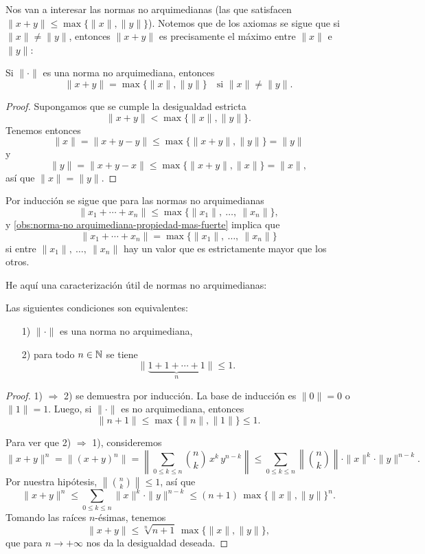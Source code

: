 \documentclass{article}
\numberwithin{equation}{section}
\theoremstyle{definition}
\begin{document}
Nos van a interesar las normas no arquimedianas (las que satisfacen
$\|x + y\| \le \max \{ \|x\|, \|y\| \}$). Notemos que de los axiomas se sigue
que si $\|x\| \ne \|y\|$, entonces $\|x+y\|$ es precisamente el máximo entre
$\|x\|$ e $\|y\|$:

\begin{observacion}
  \label{obs:norma-no arquimediana-propiedad-mas-fuerte}
  Si $\|\cdot\|$ es una norma no arquimediana, entonces
  $$\|x + y\| = \max \{ \|x\|, \|y\| \} \quad\text{si }\|x\| \ne \|y\|.$$

  \begin{proof}
    Supongamos que se cumple la desigualdad estricta
    $$\|x+y\| < \max \{ \|x\|, \|y\| \}.$$
    Tenemos entonces
    $$\|x\| = \|x+y-y\| \le \max \{ \|x+y\|, \|y\| \} = \|y\|$$
    y
    $$\|y\| = \|x+y-x\| \le \max \{ \|x+y\|, \|x\| \} = \|x\|,$$
    así que $\|x\| = \|y\|$.
  \end{proof}
\end{observacion}

Por inducción se sigue que para las normas no arquimedianas
$$\|x_1 + \cdots + x_n\| \le \max \{ \|x_1\|, ~ \ldots, ~ \|x_n\| \},$$
y \ref{obs:norma-no arquimediana-propiedad-mas-fuerte} implica que
$$\|x_1 + \cdots + x_n\| = \max \{ \|x_1\|, ~ \ldots, ~ \|x_n\| \}$$
si entre $\|x_1\|, ~ \ldots, ~ \|x_n\|$ hay un valor que es estrictamente mayor
que los otros.

\vspace{1em}

He aquí una caracterización útil de normas no arquimedianas:

\begin{observacion}
  \label{obs:caracterizacion-de-normas-no-arquimedianas-valor-en-Z}
  Las siguientes condiciones son equivalentes:

  \begin{enumerate}
  \item[1)] $\|\cdot\|$ es una norma no arquimediana,

  \item[2)] para todo $n\in \mathbb{N}$ se tiene
    $$\|\underbrace{1+1+\cdots+1}_n\| \le 1.$$
  \end{enumerate}

  \begin{proof}
    1) $\Rightarrow$ 2) se demuestra por inducción. La base de inducción
    es $\|0\| = 0$ o $\|1\| = 1$. Luego, si $\|\cdot\|$ es no arquimediana,
    entonces
    $$\|n+1\| \le \max \{ \|n\|, \|1\| \} \le 1.$$

    Para ver que 2) $\Rightarrow$ 1), consideremos
    \[ \|x+y\|^n =
       \|(x+y)^n\| =
       \left\|\sum_{0 \le k \le n} {n\choose k}\,x^k\,y^{n-k}\right\| \le
       \sum_{0\le k \le n} \left\|{n\choose k}\right\|\cdot\|x\|^k\cdot\|y\|^{n-k}. \]
    Por nuestra hipótesis, $\left\|{n\choose k}\right\| \le 1$, así que
    \[ \|x+y\|^n \le
       \sum_{0\le k \le n} \|x\|^k \cdot \|y\|^{n-k} \le
       (n+1)\,\max \{ \|x\|, \|y\| \}^n. \]
    Tomando las raíces $n$-ésimas, tenemos
    $$\|x+y\| \le \sqrt[n]{n+1}\,\max \{ \|x\|, \|y\| \},$$
    que para $n \to +\infty$ nos da la desigualdad deseada.
  \end{proof}
\end{observacion}
\end{document}

